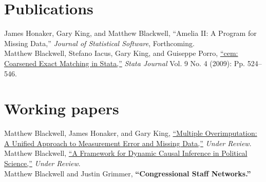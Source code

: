 \documentclass[margin,line]{res}
\newenvironment{list1}{
  \begin{list}{\ding{113}}{%
      \setlength{\itemsep}{0in}
      \setlength{\parsep}{0in} \setlength{\parskip}{0in}
      \setlength{\topsep}{0in} \setlength{\partopsep}{0in} 
      \setlength{\leftmargin}{0.83 cm}}}{\end{list}}
\begin{document}
\begin{resume}
\section{\sc Publications}

James Honaker, Gary King, and Matthew Blackwell, ``Amelia II: A
Program for Missing Data,'' \emph{Journal of Statistical Software},
Forthcoming. 
\vspace{1em}\\
Matthew Blackwell, Stefano Iacus, Gary King, and Guiseppe Porro, \href{http://gking.harvard.edu/files/cemStata.pdf}{``cem: Coarsened Exact Matching in Stata,''} \emph{Stata
  Journal} Vol. 9 No. 4 (2009): Pp. 524--546.

\section{\sc Working papers}

Matthew Blackwell, James Honaker, and Gary King, \href{http://gking.harvard.edu/files/measure.pdf}{``Multiple Overimputation: A Unified Approach to Measurement Error and
Missing Data,''} \emph{Under Review}.\vspace{1em}\\
Matthew Blackwell, \href{http://mattblackwell.org/files/papers/dynci.pdf}{``A Framework for Dynamic Causal Inference in Political Science,''} \emph{Under Review}.\vspace{1em}\\
Matthew Blackwell and Justin Grimmer, {\bf ``Congressional Staff Networks.''}



\end{resume}
\end{document}
